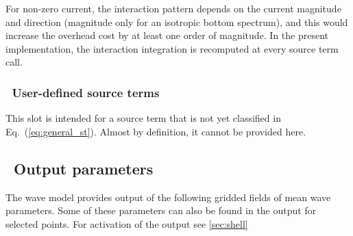 For non-zero current, the interaction pattern depends on the current magnitude
and direction (magnitude only for an isotropic bottom spectrum), and this
would increase the overhead cost by at least one order of magnitude. In the
present implementation, the interaction integration is recomputed at every
source term call.


\vsssub
\subsubsection{~User-defined source terms} \label{sec:sxx}
\vsssub

This slot is intended for a source term that is not yet classified in
Eq.~(\ref{eq:general_st}). Almost by definition, it cannot be provided here.


\vssub
\subsection{~Output parameters} \label{sub:outpars}
\vssub

The wave model provides output of the following gridded fields of mean wave
parameters. Some of these parameters can also be found in the output for
selected points. For activation of the output see \para\ref{sec:shell}

